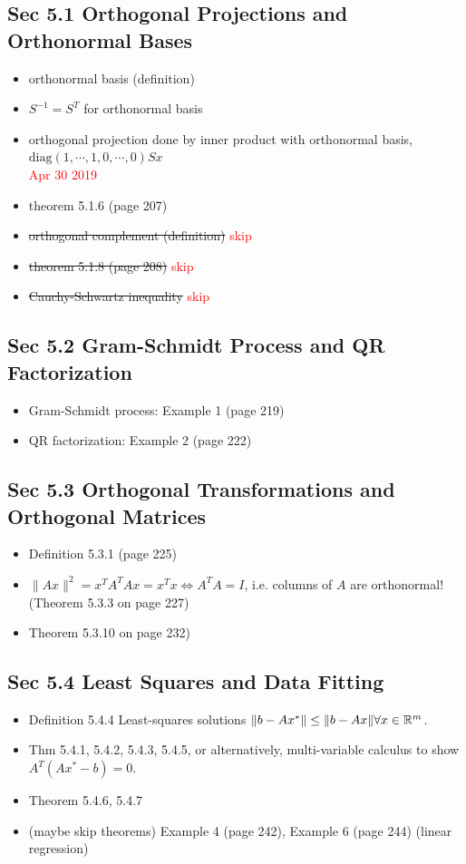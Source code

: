 \documentclass[12pt,a4paper]{article}
\newcommand{\red}[1]{\textcolor{red}{#1}}
\def\R{\ifmmode\mathbb R\fi}
\begin{document}
\subsection*{Sec 5.1 Orthogonal Projections and Orthonormal Bases}
\begin{itemize}
    \item orthonormal basis (definition)
    \item $S^{-1} = S^T$ for orthonormal basis
    \item orthogonal projection done by inner product with orthonormal basis, $\mbox{diag}(1, \cdots, 1, 0, \cdots, 0)Sx$
\red{\\Apr 30 2019}
    \item theorem 5.1.6 (page 207)
    \item \st{orthogonal complement (definition)} \red{skip}
    \item \st{theorem 5.1.8 (page 208)} \red{skip}
    \item \st{Cauchy-Schwartz inequality} \red{skip}
\end{itemize}

\subsection*{Sec 5.2 Gram-Schmidt Process and QR Factorization}
\begin{itemize}
    \item Gram-Schmidt process: Example 1 (page 219)
    \item QR factorization: Example 2 (page 222)
\end{itemize}

\subsection*{Sec 5.3 Orthogonal Transformations and Orthogonal Matrices}
\begin{itemize}
    \item Definition 5.3.1 (page 225)
    \item $\|Ax\|^2 = x^TA^TAx = x^Tx \Leftrightarrow A^TA = I$, i.e. columns of $A$ are orthonormal! (Theorem 5.3.3 on page 227)
    \item Theorem 5.3.10 on page 232)
\end{itemize}

\subsection*{Sec 5.4 Least Squares and Data Fitting}
\begin{itemize}
    \item Definition 5.4.4 Least-squares solutions $\|b-Ax^\ast\|\leq \|b-Ax\| \forall x\in \R^m$.
    \item Thm 5.4.1, 5.4.2, 5.4.3, 5.4.5, or alternatively, multi-variable calculus to show $A^T(Ax^\ast -b) = 0$.
    \item Theorem 5.4.6, 5.4.7
    \item (maybe skip theorems) Example 4 (page 242), Example 6 (page 244) (linear regression)
\end{itemize}
\end{document}
